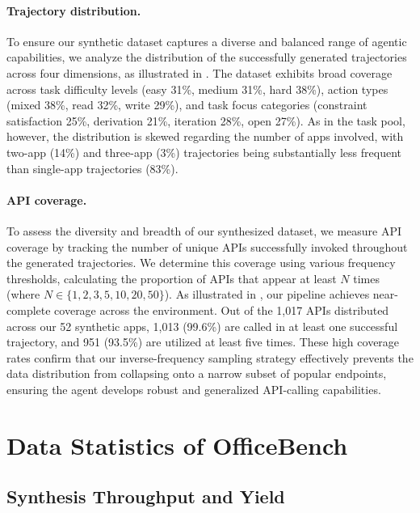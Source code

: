 \paragraph{Trajectory distribution.}
To ensure our synthetic dataset captures a diverse and balanced range of agentic capabilities, we analyze the distribution of the successfully generated trajectories across four dimensions, as illustrated in . The dataset exhibits broad coverage across task difficulty levels (easy 31\%, medium 31\%, hard 38\%), action types (mixed 38\%, read 32\%, write 29\%), and task focus categories (constraint satisfaction 25\%, derivation 21\%, iteration 28\%, open 27\%). As in the task pool, however, the distribution is skewed regarding the number of apps involved, with two-app (14\%) and three-app (3\%) trajectories being substantially less frequent than single-app trajectories (83\%).

\paragraph{API coverage.}
To assess the diversity and breadth of our synthesized dataset, we measure API coverage by tracking the number of unique APIs successfully invoked throughout the generated trajectories. We determine this coverage using various frequency thresholds, calculating the proportion of APIs that appear at least $N$ times (where $N \in \{1, 2, 3, 5, 10, 20, 50\}$). As illustrated in , our pipeline achieves near-complete coverage across the environment. Out of the 1,017 APIs distributed across our 52 synthetic apps, 1,013 (99.6\%) are called in at least one successful trajectory, and 951 (93.5\%) are utilized at least five times. These high coverage rates confirm that our inverse-frequency sampling strategy effectively prevents the data distribution from collapsing onto a narrow subset of popular endpoints, ensuring the agent develops robust and generalized API-calling capabilities.


\section{Data Statistics of OfficeBench}
\label{app:ob_stats}



\subsection{Synthesis Throughput and Yield}
\label{app:ob-throughput}

